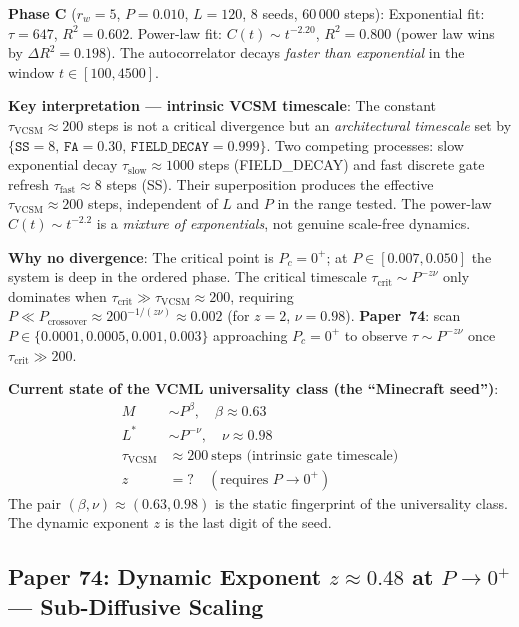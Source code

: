 \documentclass[11pt]{article}
\begin{document}
\textbf{Phase C} ($r_w{=}5$, $P{=}0.010$, $L{=}120$, 8 seeds, 60\,000 steps):
Exponential fit: $\tau=647$, $R^2=0.602$.
Power-law fit: $C(t)\sim t^{-2.20}$, $R^2=0.800$ (power law wins by $\Delta R^2=0.198$).
The autocorrelator decays \emph{faster than exponential} in the window $t\in[100,4500]$.

\textbf{Key interpretation --- intrinsic VCSM timescale}:
The constant $\tau_\mathrm{VCSM}\approx200$ steps is not a critical divergence but an
\emph{architectural timescale} set by $\{\texttt{SS}=8,\,\texttt{FA}=0.30,\,\texttt{FIELD\_DECAY}=0.999\}$.
Two competing processes: slow exponential decay $\tau_\mathrm{slow}\approx1000$ steps
(FIELD\_DECAY) and fast discrete gate refresh $\tau_\mathrm{fast}\approx8$ steps (SS).
Their superposition produces the effective $\tau_\mathrm{VCSM}\approx200$ steps,
independent of $L$ and $P$ in the range tested.
The power-law $C(t)\sim t^{-2.2}$ is a \emph{mixture of exponentials}, not genuine scale-free dynamics.

\textbf{Why no divergence}:
The critical point is $P_c=0^+$; at $P\in[0.007,0.050]$ the system is deep in the ordered phase.
The critical timescale $\tau_\mathrm{crit}\sim P^{-z\nu}$ only dominates when
$\tau_\mathrm{crit}\gg\tau_\mathrm{VCSM}\approx200$, requiring
$P\ll P_\mathrm{crossover}\approx200^{-1/(z\nu)}\approx0.002$ (for $z=2$, $\nu=0.98$).
\textbf{Paper~74}: scan $P\in\{0.0001,0.0005,0.001,0.003\}$ approaching $P_c=0^+$
to observe $\tau\sim P^{-z\nu}$ once $\tau_\mathrm{crit}\gg200$.

\textbf{Current state of the VCML universality class (the ``Minecraft seed'')}:
\begin{align*}
  M   &\sim P^\beta,\quad\beta\approx0.63 \\
  L^* &\sim P^{-\nu},\quad\nu\approx0.98 \\
  \tau_\mathrm{VCSM} &\approx 200\ \text{steps (intrinsic gate timescale)} \\
  z   &= \text{?}\quad(\text{requires }P\to0^+)
\end{align*}
The pair $(\beta,\nu)\approx(0.63,0.98)$ is the static fingerprint of the universality class.
The dynamic exponent $z$ is the last digit of the seed.

\subsection*{Paper 74: Dynamic Exponent $z\approx0.48$ at $P\to0^+$ --- Sub-Diffusive Scaling}
\end{document}
